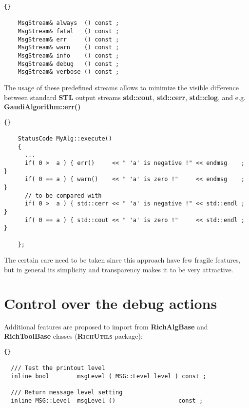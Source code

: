 \documentclass{lhcbnote}
\newcommand{\bftt}         {\ttfamily\bfseries}
\newcommand{\scbf}         {\scshape\bfseries}
\begin{document}
\begin{scriptsize}
  \begin{lstlisting}{}

    MsgStream& always  () const ;
    MsgStream& fatal   () const ;
    MsgStream& err     () const ;
    MsgStream& warn    () const ;
    MsgStream& info    () const ;
    MsgStream& debug   () const ;
    MsgStream& verbose () const ;

  \end{lstlisting}
\end{scriptsize}

The usage of these predefined streams
allows to minimize the visible difference between
standard {\scbf{STL}} output streams
{\bftt{std::cout}}, {\bftt{std::cerr}},
{\bftt{std::clog}}, and e.g. {\bftt{GaudiAlgorithm::err()}}

\begin{scriptsize}
 \begin{lstlisting}{}

    StatusCode MyAlg::execute()
    {
      ...
      if( 0 >  a ) { err()     << " 'a' is negative !" << endmsg    ; }
      if( 0 == a ) { warn()    << " 'a' is zero !"     << endmsg    ; }
      // to be compared with
      if( 0 >  a ) { std::cerr << " 'a' is negative !" << std::endl ; }
      if( 0 == a ) { std::cout << " 'a' is zero !"     << std::endl ; }

    };

 \end{lstlisting}
\end{scriptsize}

The certain care need to be taken since this approach have
few fragile features, but in general its simplicity and
transparency makes it to be very attractive.

\section{Control over the debug actions}
Additional features are proposed to import from
{\bftt{RichAlgBase}} and {\bftt{RichToolBase}} classes
({\scbf{RichUtils}} package):

\begin{scriptsize}
 \begin{lstlisting}{}

  /// Test the printout level
  inline bool        msgLevel ( MSG::Level level ) const ;

  /// Return message level setting
  inline MSG::Level  msgLevel ()                  const ;

 \end{lstlisting}
\end{scriptsize}
\end{document}
